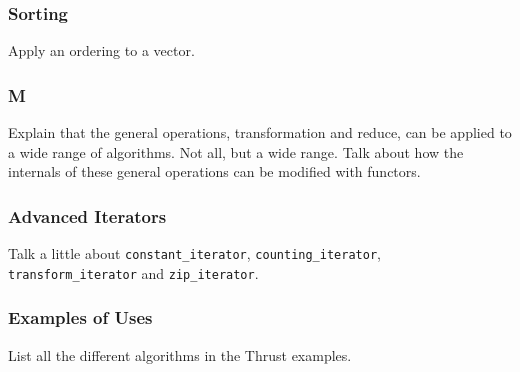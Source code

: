 \begin{frame}[fragile]
  \frametitle{Sorting}
  Apply an ordering to a vector.
\end{frame}

\begin{frame}
  \frametitle{M}
  Explain that the general operations, transformation and
  reduce, can be applied to a wide range of algorithms.
  Not all, but a wide range. Talk about how the internals of
  these general operations can be modified with functors.
\end{frame}

\begin{frame}[fragile]
  \frametitle{Advanced Iterators}
  Talk a little about \lstinline|constant_iterator|,
  \lstinline|counting_iterator|, \lstinline|transform_iterator| and
  \lstinline|zip_iterator|.
\end{frame}

\begin{frame}
  \frametitle{Examples of Uses}
  List all the different algorithms in the Thrust examples.
\end{frame}

